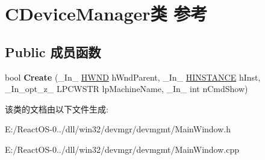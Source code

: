 \hypertarget{class_c_device_manager}{}\section{C\+Device\+Manager类 参考}
\label{class_c_device_manager}
\subsection*{Public 成员函数}
\begin{DoxyCompactItemize}
\item 
\mbox{\label{class_c_device_manager_a7253781c8eaa79d23528853d3cbf8132}} 
bool {\bfseries Create} (\+\_\+\+In\+\_\+ \hyperlink{interfacevoid}{H\+W\+ND} h\+Wnd\+Parent, \+\_\+\+In\+\_\+ \hyperlink{interfacevoid}{H\+I\+N\+S\+T\+A\+N\+CE} h\+Inst, \+\_\+\+In\+\_\+opt\+\_\+z\+\_\+ L\+P\+C\+W\+S\+TR lp\+Machine\+Name, \+\_\+\+In\+\_\+ int n\+Cmd\+Show)
\end{DoxyCompactItemize}


该类的文档由以下文件生成\+:\begin{DoxyCompactItemize}
\item 
E\+:/\+React\+O\+S-\/0../dll/win32/devmgr/devmgmt/Main\+Window.\+h\item 
E\+:/\+React\+O\+S-\/0../dll/win32/devmgr/devmgmt/Main\+Window.\+cpp\end{DoxyCompactItemize}
